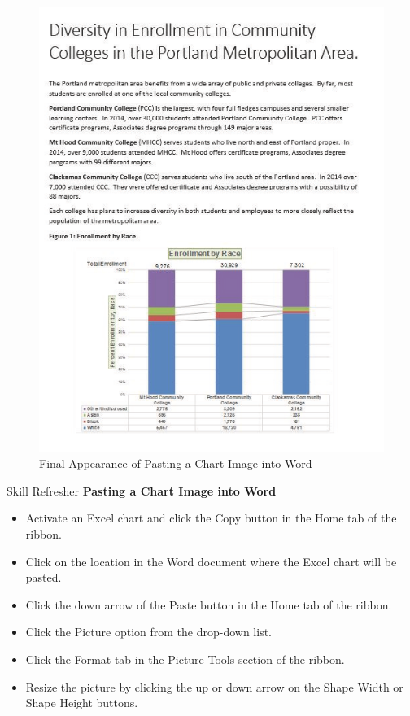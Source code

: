 \begin{figure}[H]
	\centering
	\includegraphics[width=\maxwidth{.95\linewidth}]{gfx/ch04_fig45}
	\caption{Final Appearance of Pasting a Chart Image into Word}
	\label{04:fig45}
\end{figure}

\begin{center}
	\begin{sklbox}{Skill Refresher}
		\textbf{Pasting a Chart Image into Word}
		\\
		\begin{itemize}
			\setlength{\itemsep}{0pt}
			\setlength{\parskip}{0pt}
			\setlength{\parsep}{0pt}

			\item Activate an Excel chart and click the Copy button in the Home tab of the ribbon.
			\item Click on the location in the Word document where the Excel chart will be pasted.
			\item Click the down arrow of the Paste button in the Home tab of the ribbon.
			\item Click the Picture option from the drop-down list.
			\item Click the Format tab in the Picture Tools section of the ribbon.
			\item Resize the picture by clicking the up or down arrow on the Shape Width or Shape Height buttons.
			
		\end{itemize}
	\end{sklbox}
\end{center}

